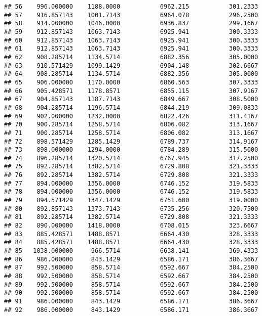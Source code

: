 \documentclass[]{article}
\begin{document}
\begin{verbatim}
## 56    996.000000    1188.0000           6962.215           301.2333
## 57    916.857143    1001.7143           6964.078           296.2500
## 58    914.000000    1046.0000           6936.837           299.1667
## 59    912.857143    1063.7143           6925.941           300.3333
## 60    912.857143    1063.7143           6925.941           300.3333
## 61    912.857143    1063.7143           6925.941           300.3333
## 62    908.285714    1134.5714           6882.356           305.0000
## 63    910.571429    1099.1429           6904.148           302.6667
## 64    908.285714    1134.5714           6882.356           305.0000
## 65    906.000000    1170.0000           6860.563           307.3333
## 66    905.428571    1178.8571           6855.115           307.9167
## 67    904.857143    1187.7143           6849.667           308.5000
## 68    904.285714    1196.5714           6844.219           309.0833
## 69    902.000000    1232.0000           6822.426           311.4167
## 70    900.285714    1258.5714           6806.082           313.1667
## 71    900.285714    1258.5714           6806.082           313.1667
## 72    898.571429    1285.1429           6789.737           314.9167
## 73    898.000000    1294.0000           6784.289           315.5000
## 74    896.285714    1320.5714           6767.945           317.2500
## 75    892.285714    1382.5714           6729.808           321.3333
## 76    892.285714    1382.5714           6729.808           321.3333
## 77    894.000000    1356.0000           6746.152           319.5833
## 78    894.000000    1356.0000           6746.152           319.5833
## 79    894.571429    1347.1429           6751.600           319.0000
## 80    892.857143    1373.7143           6735.256           320.7500
## 81    892.285714    1382.5714           6729.808           321.3333
## 82    890.000000    1418.0000           6708.015           323.6667
## 83    885.428571    1488.8571           6664.430           328.3333
## 84    885.428571    1488.8571           6664.430           328.3333
## 85   1038.000000     966.5714           6638.141           369.4333
## 86    986.000000     843.1429           6586.171           386.3667
## 87    992.500000     858.5714           6592.667           384.2500
## 88    992.500000     858.5714           6592.667           384.2500
## 89    992.500000     858.5714           6592.667           384.2500
## 90    992.500000     858.5714           6592.667           384.2500
## 91    986.000000     843.1429           6586.171           386.3667
## 92    986.000000     843.1429           6586.171           386.3667

\end{verbatim}
\end{document}
